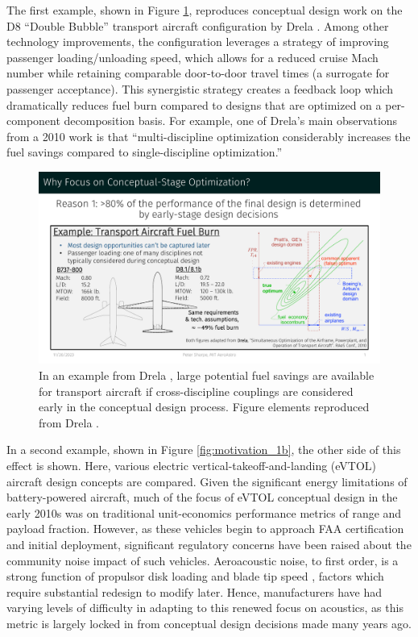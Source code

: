 \documentclass[12pt,vi,oneside,table]{report}
\begin{document}
    The first example, shown in Figure \ref{fig:motivation_1a}, reproduces conceptual design work on the D8 ``Double Bubble'' transport aircraft configuration by Drela \cite{drela_development_2011, drela_simultaneous_2010}. Among other technology improvements, the configuration leverages a strategy of improving passenger loading/unloading speed, which allows for a reduced cruise Mach number while retaining comparable door-to-door travel times (a surrogate for passenger acceptance). This synergistic strategy creates a feedback loop which dramatically reduces fuel burn compared to designs that are optimized on a per-component decomposition basis. For example, one of Drela's main observations from a 2010 work \cite{drela_simultaneous_2010} is that ``multi-discipline optimization considerably increases the fuel savings compared to single-discipline optimization.''

    \begin{figure}[H]
        \centering
        \includegraphics[page=1,trim=1cm 1.3cm 1cm 5cm, clip, width=\textwidth]{../figures/motivation_for_conceptual_MDO_focus.pdf}
        \caption{In an example from Drela \cite{drela_development_2011}, large potential fuel savings are available for transport aircraft if cross-discipline couplings are considered early in the conceptual design process. Figure elements reproduced from Drela \cite{drela_simultaneous_2010}.}
        \label{fig:motivation_1a}
    \end{figure}

    In a second example, shown in Figure \ref{fig:motivation_1b}, the other side of this effect is shown. Here, various electric vertical-takeoff-and-landing (eVTOL) aircraft design concepts are compared. Given the significant energy limitations of battery-powered aircraft, much of the focus of eVTOL conceptual design in the early 2010s was on traditional unit-economics performance metrics of range and payload fraction. However, as these vehicles begin to approach FAA certification and initial deployment, significant regulatory concerns have been raised about the community noise impact of such vehicles. Aeroacoustic noise, to first order, is a strong function of propulsor disk loading and blade tip speed \cite{marte_review_1970}, factors which require substantial redesign to modify later. Hence, manufacturers have had varying levels of difficulty in adapting to this renewed focus on acoustics, as this metric is largely locked in from conceptual design decisions made many years ago.
\end{document}
